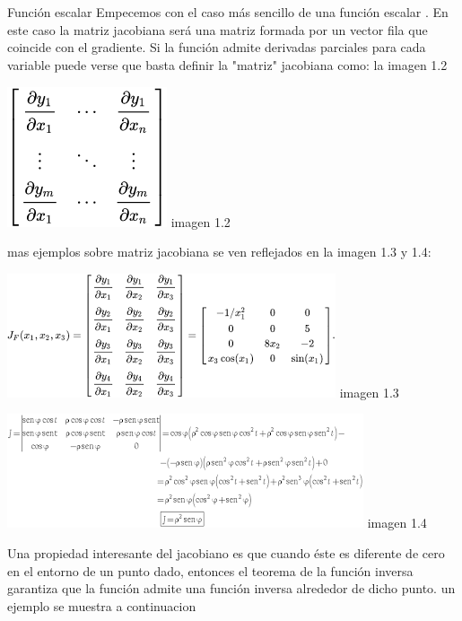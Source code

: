 \documentclass[10pt,a4paper]{article}
\begin{document}
\\ \\
\begin{huge}
Función escalar
Empecemos con el caso más sencillo de una función escalar  . En este caso la matriz jacobiana será una matriz formada por un vector fila que coincide con el gradiente. Si la función admite derivadas parciales para cada variable puede verse que basta definir la "matriz" jacobiana como: la imagen 1.2
\end{huge}
 \begin{center}
\includegraphics[scale=1.2]{imagenes/escalar.png} imagen 1.2
\end{center}
 mas ejemplos sobre matriz jacobiana se ven reflejados en la imagen 1.3 y 1.4:
 \begin{center}
\includegraphics[scale=1.3]{imagenes/descarga.png} imagen 1.3
\end{center}
\begin{center}
\includegraphics[scale=1.3]{imagenes/jacobiano.png} imagen 1.4
\end{center}
 \begin{huge}
 Una propiedad interesante del jacobiano es que cuando éste es diferente de cero en el entorno de un punto dado, entonces el teorema de la función inversa garantiza que la función admite una función inversa alrededor de dicho punto. un  ejemplo se muestra a continuacion
 \end{huge}
\end{document}
